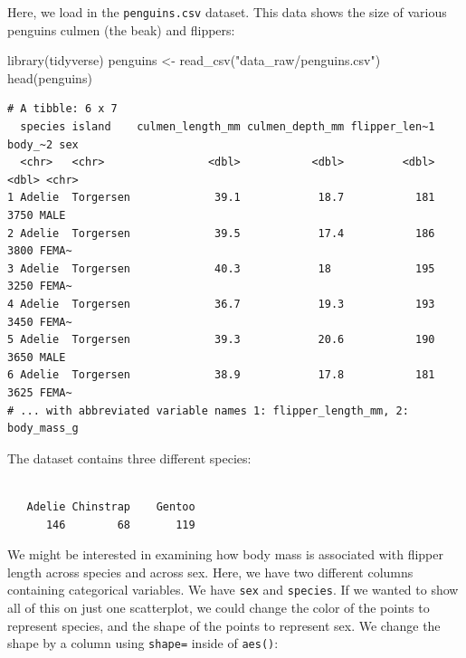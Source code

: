 \documentclass[
  letterpaper,
  DIV=11,
  numbers=noendperiod]{scrreprt}
\newenvironment{Shaded}{\begin{snugshade}}{\end{snugshade}}
\newcommand{\FunctionTok}[1]{\textcolor[rgb]{0.28,0.35,0.67}{#1}}
\newcommand{\NormalTok}[1]{\textcolor[rgb]{0.00,0.23,0.31}{#1}}
\newcommand{\OtherTok}[1]{\textcolor[rgb]{0.00,0.23,0.31}{#1}}
\newcommand{\SpecialCharTok}[1]{\textcolor[rgb]{0.37,0.37,0.37}{#1}}
\newcommand{\StringTok}[1]{\textcolor[rgb]{0.13,0.47,0.30}{#1}}
\begin{document}
Here, we load in the \texttt{penguins.csv} dataset. This data shows the
size of various penguins culmen (the beak) and flippers:

\begin{Shaded}
\begin{Highlighting}[]
\FunctionTok{library}\NormalTok{(tidyverse)}
\NormalTok{penguins }\OtherTok{\textless{}{-}} \FunctionTok{read\_csv}\NormalTok{(}\StringTok{"data\_raw/penguins.csv"}\NormalTok{)}
\FunctionTok{head}\NormalTok{(penguins)}
\end{Highlighting}
\end{Shaded}

\begin{verbatim}
# A tibble: 6 x 7
  species island    culmen_length_mm culmen_depth_mm flipper_len~1 body_~2 sex  
  <chr>   <chr>                <dbl>           <dbl>         <dbl>   <dbl> <chr>
1 Adelie  Torgersen             39.1            18.7           181    3750 MALE 
2 Adelie  Torgersen             39.5            17.4           186    3800 FEMA~
3 Adelie  Torgersen             40.3            18             195    3250 FEMA~
4 Adelie  Torgersen             36.7            19.3           193    3450 FEMA~
5 Adelie  Torgersen             39.3            20.6           190    3650 MALE 
6 Adelie  Torgersen             38.9            17.8           181    3625 FEMA~
# ... with abbreviated variable names 1: flipper_length_mm, 2: body_mass_g
\end{verbatim}

The dataset contains three different species:

\begin{Shaded}
\end{Shaded}

\begin{verbatim}

   Adelie Chinstrap    Gentoo 
      146        68       119 
\end{verbatim}

We might be interested in examining how body mass is associated with
flipper length across species and across sex. Here, we have two
different columns containing categorical variables. We have \texttt{sex}
and \texttt{species}. If we wanted to show all of this on just one
scatterplot, we could change the color of the points to represent
species, and the shape of the points to represent sex. We change the
shape by a column using \texttt{shape=} inside of \texttt{aes()}:
\end{document}
